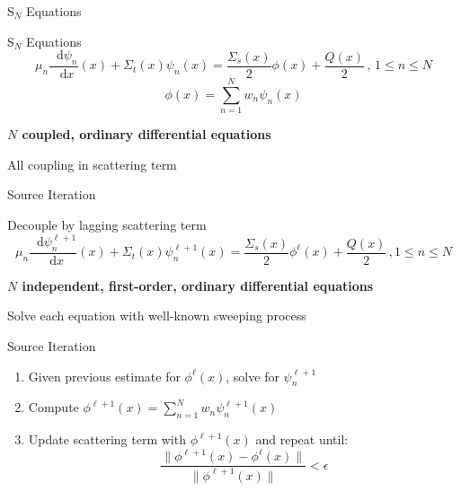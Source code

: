 \documentclass[10pt,draft]{beamer}
\newcommand{\SN}{S$_N$\xspace}
\newcommand{\ud}{\mathop{}\!\mathrm{d}} %
\newcommand{\dderiv}[2]{\frac{\ud #1}{\ud #2}}
\begin{document}
\begin{frame}{\SN Equations}

	\begin{block}{\SN Equations}
	\begin{equation*}
		\mu_n \dderiv{\psi_n}{x}(x) + \Sigma_t(x) \psi_n(x) = 
		\frac{\Sigma_s(x)}{2} \phi(x) + \frac{Q(x)}{2} \,, \, 1 \leq n \leq N
	\end{equation*}
	\begin{equation*}
		\phi(x) = \sum_{n=1}^N w_n \psi_n(x)
	\end{equation*}
	\end{block}

	\textbf{$N$ coupled, ordinary differential equations}

	All coupling in scattering term 

\end{frame}

\begin{frame}{Source Iteration}

	Decouple by lagging scattering term 
	\begin{equation*}
		\mu_n \dderiv{\psi_n^{\ell+1}}{x}(x) + \Sigma_t(x) \psi_n^{\ell+1}(x) = 
		\frac{\Sigma_s(x)}{2} \phi^{\ell}(x) + \frac{Q(x)}{2} \,, 1 \leq n \leq N        
	\end{equation*}

	\textbf{$N$ independent, first-order, ordinary differential equations}

	Solve each equation with well-known sweeping process 

	\begin{exampleblock}{Source Iteration}
	\begin{enumerate}
		\item Given previous estimate for $\phi^{\ell}(x)$, solve for $\psi_n^{\ell+1}$

		\item Compute $\phi^{\ell+1}(x) = 
			\sum_{n=1}^N w_n \psi_n^{\ell+1}(x)$ 

		\item Update scattering term with $\phi^{\ell+1}(x)$ and repeat until: 
			 \begin{equation*}
				\frac{\|\phi^{\ell+1}(x) - \phi^{\ell}(x)\|}{\|\phi^{\ell+1}(x)\|} < \epsilon 
			 \end{equation*}

	\end{enumerate}
	\end{exampleblock}

\end{frame}
\end{document}
